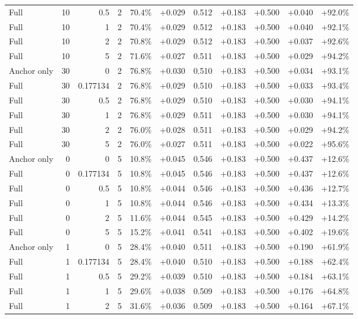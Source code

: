 \begin{table}[htbp]
\begin{tabular}{lrrrccccccc}
Full & 10 & 0.5 & 2 & 70.4\% & +0.029 & 0.512 & +0.183 & +0.500 & +0.040 & +92.0\% \\
Full & 10 & 1 & 2 & 70.4\% & +0.029 & 0.512 & +0.183 & +0.500 & +0.040 & +92.1\% \\
Full & 10 & 2 & 2 & 70.8\% & +0.029 & 0.512 & +0.183 & +0.500 & +0.037 & +92.6\% \\
Full & 10 & 5 & 2 & 71.6\% & +0.027 & 0.511 & +0.183 & +0.500 & +0.029 & +94.2\% \\
Anchor only & 30 & 0 & 2 & 76.8\% & +0.030 & 0.510 & +0.183 & +0.500 & +0.034 & +93.1\% \\
Full & 30 & 0.177134 & 2 & 76.8\% & +0.029 & 0.510 & +0.183 & +0.500 & +0.033 & +93.4\% \\
Full & 30 & 0.5 & 2 & 76.8\% & +0.029 & 0.510 & +0.183 & +0.500 & +0.030 & +94.1\% \\
Full & 30 & 1 & 2 & 76.8\% & +0.029 & 0.511 & +0.183 & +0.500 & +0.030 & +94.1\% \\
Full & 30 & 2 & 2 & 76.0\% & +0.028 & 0.511 & +0.183 & +0.500 & +0.029 & +94.2\% \\
Full & 30 & 5 & 2 & 76.0\% & +0.027 & 0.511 & +0.183 & +0.500 & +0.022 & +95.6\% \\
Anchor only & 0 & 0 & 5 & 10.8\% & +0.045 & 0.546 & +0.183 & +0.500 & +0.437 & +12.6\% \\
Full & 0 & 0.177134 & 5 & 10.8\% & +0.045 & 0.546 & +0.183 & +0.500 & +0.437 & +12.6\% \\
Full & 0 & 0.5 & 5 & 10.8\% & +0.044 & 0.546 & +0.183 & +0.500 & +0.436 & +12.7\% \\
Full & 0 & 1 & 5 & 10.8\% & +0.044 & 0.546 & +0.183 & +0.500 & +0.434 & +13.3\% \\
Full & 0 & 2 & 5 & 11.6\% & +0.044 & 0.545 & +0.183 & +0.500 & +0.429 & +14.2\% \\
Full & 0 & 5 & 5 & 15.2\% & +0.041 & 0.541 & +0.183 & +0.500 & +0.402 & +19.6\% \\
Anchor only & 1 & 0 & 5 & 28.4\% & +0.040 & 0.511 & +0.183 & +0.500 & +0.190 & +61.9\% \\
Full & 1 & 0.177134 & 5 & 28.4\% & +0.040 & 0.510 & +0.183 & +0.500 & +0.188 & +62.4\% \\
Full & 1 & 0.5 & 5 & 29.2\% & +0.039 & 0.510 & +0.183 & +0.500 & +0.184 & +63.1\% \\
Full & 1 & 1 & 5 & 29.6\% & +0.038 & 0.509 & +0.183 & +0.500 & +0.176 & +64.8\% \\
Full & 1 & 2 & 5 & 31.6\% & +0.036 & 0.509 & +0.183 & +0.500 & +0.164 & +67.1\% \\

\end{tabular}
\end{table}
